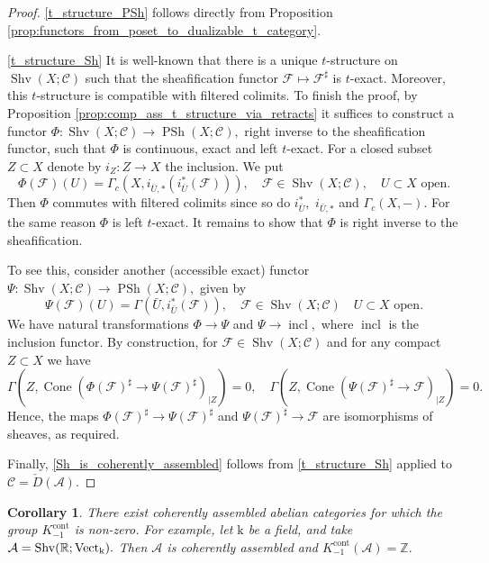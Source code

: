 \documentclass[11pt,leqno]{amsart}
\newtheorem{cor}[theo]{Corollary}
\numberwithin{equation}{section}
\def\R{\mathbb{R}}
\def\Z{\mathbb{Z}}
\newcommand{\Cone}{\operatorname{Cone}}
\newcommand{\cont}{\operatorname{cont}}
\newcommand{\mk}{\mathrm k}
\newcommand{\cF}{{\mathcal F}}
\newcommand{\cA}{{\mathcal A}}
\newcommand{\cC}{{\mathcal C}}
\newcommand{\incl}{\operatorname{incl}}
\newcommand{\PSh}{\operatorname{PSh}}
\newcommand{\Shv}{\operatorname{Shv}}
\newcommand{\Vect}{{\rm Vect}}
\begin{document}
\begin{proof}
\ref{t_structure_PSh} follows directly from Proposition \ref{prop:functors_from_poset_to_dualizable_t_category}.

\ref{t_structure_Sh} It is well-known that there is a unique $t$-structure on $\Shv(X;\cC)$ such that the sheafification functor $\cF\mapsto\cF^{\sharp}$ is $t$-exact. Moreover, this $t$-structure is compatible with filtered colimits. To finish the proof, by Proposition \ref{prop:comp_ass_t_structure_via_retracts} it suffices to construct a functor $\Phi:\Shv(X;\cC)\to\PSh(X;\cC),$ right inverse to the sheafification functor, such that $\Phi$ is continuous, exact and left $t$-exact. For a closed subset $Z\subset X$ denote by $i_Z:Z\to X$ the inclusion. We put 
\begin{equation*}
	\Phi(\cF)(U)=\Gamma_c(X,i_{\bar{U},*}(i_{\bar{U}}^*(\cF))),\quad \cF\in\Shv(X;\cC),\quad U\subset X\text{ open}.
\end{equation*}
Then $\Phi$ commutes with filtered colimits since so do $i_{\bar{U}}^*,$ $i_{\bar{U},*}$ and $\Gamma_c(X,-).$ For the same reason $\Phi$ is left $t$-exact. It remains to show that $\Phi$ is right inverse to the sheafification.

To see this, consider another (accessible exact) functor $\Psi:\Shv(X;\cC)\to\PSh(X;\cC),$ given by
\begin{equation*}
\Psi(\cF)(U)=\Gamma(\bar{U},i_{\bar{U}}^*(\cF)),\quad \cF\in\Shv(X;\cC)\quad U\subset X\text{ open}.
\end{equation*}
We have natural transformations $\Phi\to \Psi$ and $\Psi\to\incl,$ where $\incl$ is the inclusion functor. By construction, for $\cF\in\Shv(X;\cC)$ and for any compact $Z\subset X$ we have
\begin{equation*}
\Gamma(Z,\Cone(\Phi(\cF)^{\sharp}\to \Psi(\cF)^{\sharp})_{\mid Z})=0,\quad \Gamma(Z,\Cone(\Psi(\cF)^{\sharp}\to \cF)_{\mid Z})=0.
\end{equation*}
Hence, the maps $\Phi(\cF)^{\sharp}\to\Psi(\cF)^{\sharp}$ and $\Psi(\cF)^{\sharp}\to\cF$ are isomorphisms of sheaves, as required.

Finally, \ref{Sh_is_coherently_assembled} follows from \ref{t_structure_Sh} applied to $\cC=\check{D}(\cA).$
\end{proof}

\begin{cor}\label{cor:K_-1_not_vanishing}
There exist coherently assembled abelian categories for which the group $K_{-1}^{\cont}$ is non-zero. For example, let $\mk$ be a field, and take $\cA=\Shv(\R;\Vect_{\mk}).$ Then $\cA$ is coherently assembled and $K_{-1}^{\cont}(\cA)=\Z.$ 
\end{cor}
\end{document}
